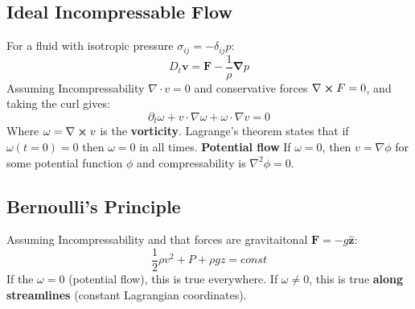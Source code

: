 \documentclass[twocolumn]{article}
\begin{document}
\subsection{Ideal Incompressable Flow}
For a fluid with isotropic pressure $\sigma_{ij} = -\delta_{ij}p$:
\begin{equation}
    D_t \boldsymbol{v} = \boldsymbol{F} - \frac{1}{\rho}\boldsymbol{\nabla}p
\end{equation}
Assuming Incompressability $\nabla\cdot v = 0$ and conservative forces $\nabla\cross F = 0$, and taking the curl gives:
\begin{equation}
    \partial_t \omega + v\cdot\nabla \omega + \omega\cdot\nabla v = 0
\end{equation}
Where $\omega = \nabla \cross v$ is the \textbf{vorticity}. Lagrange's theorem states that if $\omega(t = 0) = 0$ then $\omega = 0$ in all times.
\newline
\textbf{Potential flow}
If $\omega = 0$, then $v = \nabla \phi$ for some potential function $\phi$ and compressability is $\nabla^2 \phi = 0$.
\subsection{Bernoulli's Principle}
Assuming Incompressability and that forces are gravitaitonal $\textbf{F} = -g\hat{\textbf{z}}$:
\begin{equation}
    \frac{1}{2}\rho v^2 + P + \rho gz = const
\end{equation}
 If the $\omega = 0$ (potential flow), this is true everywhere. If $\omega \ne 0$, this is true \textbf{along streamlines} (constant Lagrangian coordinates).
\end{document}
